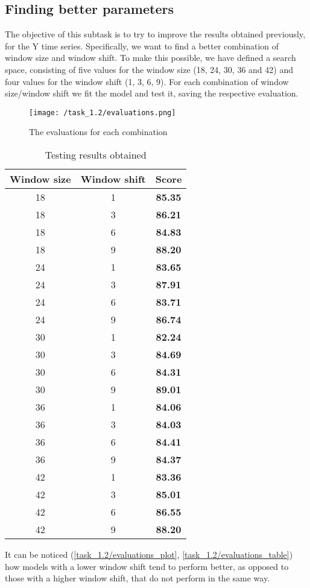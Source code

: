 \documentclass[12pt,a4paper,leqno]{article}
\begin{document}
	\subsection{Finding better parameters}
	The objective of this subtask is to try to improve the results obtained previously, for the Y time series. Specifically, we want to find a better combination of window size and window shift. To make this possible, we have defined a search space, consisting of five values for the window size (18, 24, 30, 36 and 42) and four values for the window shift (1, 3, 6, 9). For each combination of window size/window shift we fit the model and test it, saving the respective evaluation.
	\begin{figure}[h]
		\centering
		\texttt{[image: /task\_1.2/evaluations.png]}
		\caption{The evaluations for each combination}
		\label{task_1.2/evaluations_plot}
	\end{figure}
	\begin{table}
		\centering
		\begin{tabular}{|c|c|c|}
			\hline
			\textbf{Window size} & \textbf{Window shift} & \textbf{Score} \\ 
			\hline
			\hline
			18 & 1 & \textbf{85.35} \\
			18 & 3 & \textbf{86.21} \\
			18 & 6 & \textbf{84.83} \\
			18 & 9 & \textbf{88.20} \\
			24 & 1 & \textbf{83.65} \\
			24 & 3 & \textbf{87.91} \\
			24 & 6 & \textbf{83.71} \\
			24 & 9 & \textbf{86.74} \\
			30 & 1 & \textbf{82.24} \\
			30 & 3 & \textbf{84.69} \\
			30 & 6 & \textbf{84.31} \\
			30 & 9 & \textbf{89.01} \\
			36 & 1 & \textbf{84.06} \\
			36 & 3 & \textbf{84.03} \\
			36 & 6 & \textbf{84.41} \\
			36 & 9 & \textbf{84.37} \\
			42 & 1 & \textbf{83.36} \\
			42 & 3 & \textbf{85.01} \\
			42 & 6 & \textbf{86.55} \\
			42 & 9 & \textbf{88.20} \\
			\hline
		\end{tabular}
		\caption{Testing results obtained}
		\label{task_1.2/evaluations_table}
	\end{table}
	It can be noticed (\autoref{task_1.2/evaluations_plot}, \autoref{task_1.2/evaluations_table}) how models with a lower window shift tend to perform better, as opposed to those with a higher window shift, that do not perform in the same way.
	
\end{document}
